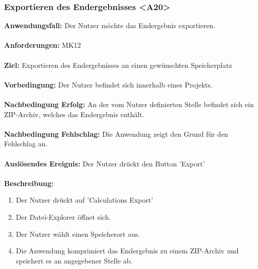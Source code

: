 \documentclass[parskip=full]{scrartcl} %
\begin{document}
\subsubsection*{Exportieren des Endergebnisses <A20>}
\textbf{Anwendungsfall:} Der Nutzer möchte das Endergebnis exportieren.\\\\
\textbf{Anforderungen:} MK12\\\\
\textbf{Ziel:} Exportieren des Endergebnisses an einen gewünschten Speicherplatz\\\\
\textbf{Vorbedingung:}  Der Nutzer befindet sich innerhalb eines Projekts.\\\\
\textbf{Nachbedingung Erfolg:} An der vom Nutzer definierten Stelle befindet sich ein ZIP-Archiv, welches das Endergebnis enthält. \\\\
\textbf{Nachbedingung Fehlschlag:} Die Anwendung zeigt den Grund für den Fehlschlag an.\\\\
\textbf{Auslösendes Ereignis:} Der Nutzer drückt den Button 'Export' \\\\
\textbf{Beschreibung:}
\begin{enumerate}
    \item Der Nutzer drückt auf 'Calculations Export'
    \item Der Datei-Explorer öffnet sich.
    \item Der Nutzer wählt einen Speicherort aus.
    \item Die Anwendung komprimiert das Endergebnis zu einem ZIP-Archiv und speichert es an angegebener Stelle ab.
\end{enumerate}
\newpage
\end{document}
